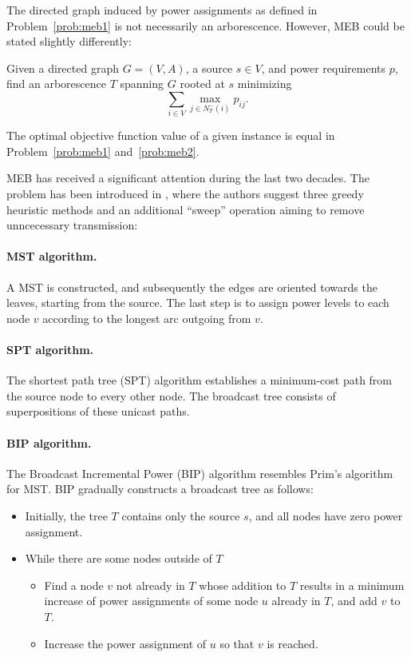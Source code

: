 The directed graph induced by power assignments as defined in Problem~\ref{prob:meb1} is not necessarily an arborescence.
However, MEB could be stated slightly differently:
\begin{problem}\label{prob:meb2}
Given a directed graph $G=(V,A)$, a source $s\in V$, and power requirements $p$, find an arborescence $T$ spanning $G$ rooted at $s$ minimizing 
	$$\sum\limits_{i\in V}\max\limits_{j\in N^-_{T}(i)}p_{ij}.$$
\end{problem}

\begin{observation}
The optimal objective function value of a given instance is equal in Problem~\ref{prob:meb1} and~\ref{prob:meb2}.
\end{observation}

MEB has received a significant attention during the last two decades.
The problem has been introduced in \cite{wieselthier00}, where the authors suggest three greedy heuristic methods and an additional ``sweep'' operation aiming to remove unncecessary transmission:
\paragraph{MST algorithm.}
A MST is constructed, and subsequently the edges are oriented towards the leaves, starting from the source.
The last step is to assign power levels to each node $v$ according to the longest arc outgoing from $v$.
\paragraph{SPT algorithm.}
The shortest path tree (SPT) algorithm establishes a minimum-cost path from the source node to every other node.
The broadcast tree consists of superpositions of these unicast paths.
\paragraph{BIP algorithm.}
The Broadcast Incremental Power (BIP) algorithm resembles Prim's algorithm for MST.
BIP gradually constructs a broadcast tree as follows:
\begin{itemize}
\item Initially, the tree $T$ contains only the source $s$, and all nodes have zero power assignment.
\item While there are some nodes outside of $T$
\begin{itemize}
	\item Find a node $v$ not already in $T$ whose addition to $T$ results in a minimum increase of power assignments of some node $u$ already in $T$, and add $v$ to $T$.
	\item Increase the power assignment of $u$ so that $v$ is reached.
\end{itemize}
\end{itemize}
